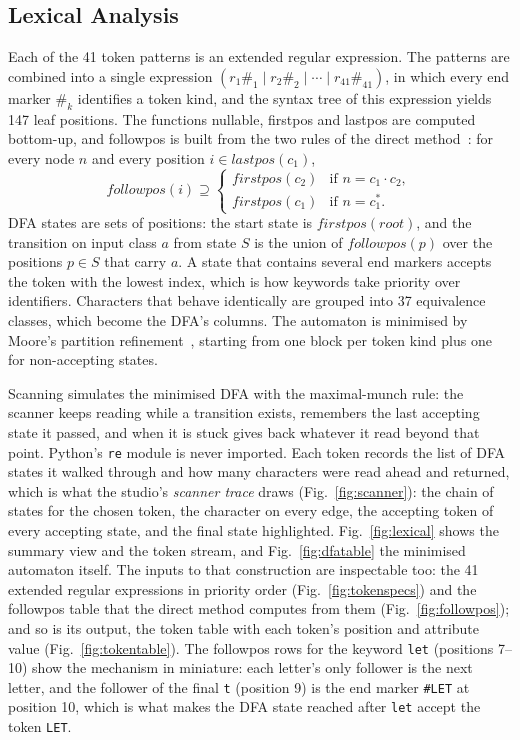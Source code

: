 \documentclass[conference]{IEEEtran}
\newcommand{\code}[1]{\texttt{#1}}
\begin{document}
\subsection{Lexical Analysis}
\label{sec:lexical}
Each of the 41 token patterns is an extended regular expression. The patterns are combined into a single expression $(r_1\#_1 \mid r_2\#_2 \mid \cdots \mid r_{41}\#_{41})$, in which every end marker $\#_k$ identifies a token kind, and the syntax tree of this expression yields 147 leaf positions. The functions nullable, firstpos and lastpos are computed bottom-up, and followpos is built from the two rules of the direct method~\cite{aho2006}: for every node $n$ and every position $i \in \mathit{lastpos}(c_1)$,
\begin{equation}
\mathit{followpos}(i) \supseteq
\begin{cases}
\mathit{firstpos}(c_2) & \text{if } n = c_1 \cdot c_2,\\
\mathit{firstpos}(c_1) & \text{if } n = c_1^{*}.
\end{cases}
\label{eq:followpos}
\end{equation}
DFA states are sets of positions: the start state is $\mathit{firstpos}(\mathit{root})$, and the transition on input class $a$ from state $S$ is the union of $\mathit{followpos}(p)$ over the positions $p \in S$ that carry $a$. A state that contains several end markers accepts the token with the lowest index, which is how keywords take priority over identifiers. Characters that behave identically are grouped into 37 equivalence classes, which become the DFA's columns. The automaton is minimised by Moore's partition refinement~\cite{moore1956}, starting from one block per token kind plus one for non-accepting states.

Scanning simulates the minimised DFA with the maximal-munch rule: the scanner keeps reading while a transition exists, remembers the last accepting state it passed, and when it is stuck gives back whatever it read beyond that point. Python's \code{re} module is never imported. Each token records the list of DFA states it walked through and how many characters were read ahead and returned, which is what the studio's \emph{scanner trace} draws (Fig.~\ref{fig:scanner}): the chain of states for the chosen token, the character on every edge, the accepting token of every accepting state, and the final state highlighted. Fig.~\ref{fig:lexical} shows the summary view and the token stream, and Fig.~\ref{fig:dfatable} the minimised automaton itself. The inputs to that construction are inspectable too: the 41 extended regular expressions in priority order (Fig.~\ref{fig:tokenspecs}) and the followpos table that the direct method computes from them (Fig.~\ref{fig:followpos}); and so is its output, the token table with each token's position and attribute value (Fig.~\ref{fig:tokentable}). The followpos rows for the keyword \code{let} (positions 7--10) show the mechanism in miniature: each letter's only follower is the next letter, and the follower of the final \code{t} (position 9) is the end marker \code{\#LET} at position 10, which is what makes the DFA state reached after \code{let} accept the token \code{LET}.
\end{document}
